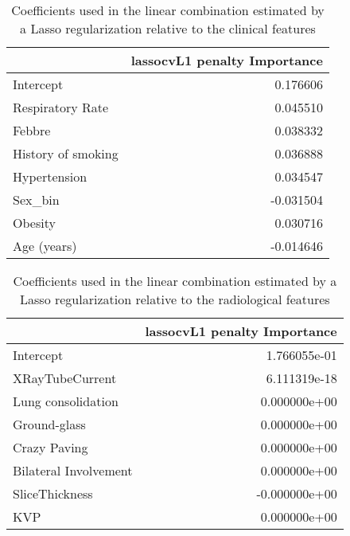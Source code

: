 \begin{table}
\caption{Coefficients used in the linear combination estimated by a Lasso regularization relative to the clinical features\label{tab:ParamCli}}
\centering
	\begin{tabular}{lr}
	\toprule
	{} &  lassocvL1 penalty Importance \\
	\midrule
	Intercept          &                      0.176606 \\
	Respiratory Rate   &                      0.045510 \\
	Febbre             &                      0.038332 \\
	History of smoking &                      0.036888 \\
	Hypertension       &                      0.034547 \\
	Sex\_bin            &                     -0.031504 \\
	Obesity            &                      0.030716 \\
	Age (years)        &                     -0.014646 \\
	\bottomrule
	\end{tabular}
\end{table}


\begin{table}
	\caption{Coefficients used in the linear combination estimated by a Lasso regularization relative to the radiological features\label{tab:ParamRadiologiche}} 
		\centering
			\begin{tabular}{lr}
			\toprule
			{} &  lassocvL1 penalty Importance \\
			\midrule
			Intercept             &                  1.766055e-01 \\
			XRayTubeCurrent       &                  6.111319e-18 \\
			Lung consolidation    &                  0.000000e+00 \\
			Ground-glass          &                  0.000000e+00 \\
			Crazy Paving          &                  0.000000e+00 \\
			Bilateral Involvement &                  0.000000e+00 \\
			SliceThickness        &                 -0.000000e+00 \\
			KVP                   &                  0.000000e+00 \\
			\bottomrule
			\end{tabular}
\end{table}


